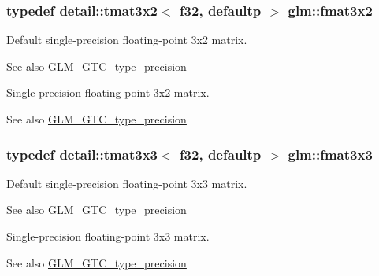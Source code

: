 \subsubsection[{\texorpdfstring{fmat3x2}{fmat3x2}}]{\setlength{\rightskip}{0pt plus 5cm}typedef detail\+::tmat3x2$<$ f32, defaultp $>$ {\bf glm\+::fmat3x2}}\hypertarget{group__gtc__type__precision_ga723b6e3dd4ff1c0d76d3c9f72ea0d9a7}{}\label{group__gtc__type__precision_ga723b6e3dd4ff1c0d76d3c9f72ea0d9a7}
Default single-\/precision floating-\/point 3x2 matrix. \begin{DoxySeeAlso}{See also}
\hyperlink{group__gtc__type__precision}{G\+L\+M\+\_\+\+G\+T\+C\+\_\+type\+\_\+precision}
\end{DoxySeeAlso}
Single-\/precision floating-\/point 3x2 matrix. \begin{DoxySeeAlso}{See also}
\hyperlink{group__gtc__type__precision}{G\+L\+M\+\_\+\+G\+T\+C\+\_\+type\+\_\+precision} 
\end{DoxySeeAlso}
\subsubsection[{\texorpdfstring{fmat3x3}{fmat3x3}}]{\setlength{\rightskip}{0pt plus 5cm}typedef detail\+::tmat3x3$<$ f32, defaultp $>$ {\bf glm\+::fmat3x3}}\hypertarget{group__gtc__type__precision_gafa6841eaaa5ee45de1d892c26b349571}{}\label{group__gtc__type__precision_gafa6841eaaa5ee45de1d892c26b349571}
Default single-\/precision floating-\/point 3x3 matrix. \begin{DoxySeeAlso}{See also}
\hyperlink{group__gtc__type__precision}{G\+L\+M\+\_\+\+G\+T\+C\+\_\+type\+\_\+precision}
\end{DoxySeeAlso}
Single-\/precision floating-\/point 3x3 matrix. \begin{DoxySeeAlso}{See also}
\hyperlink{group__gtc__type__precision}{G\+L\+M\+\_\+\+G\+T\+C\+\_\+type\+\_\+precision} 
\end{DoxySeeAlso}
